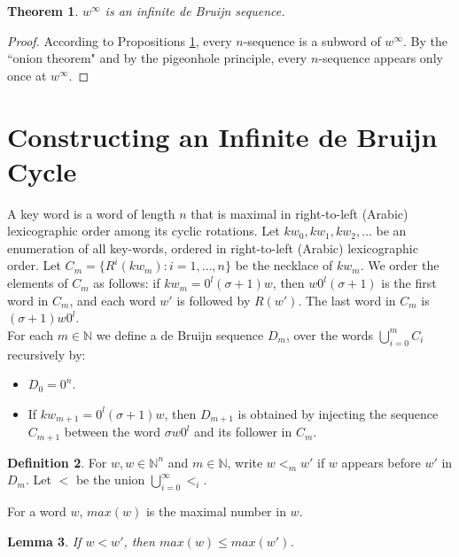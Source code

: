 \documentclass{article}
\newtheorem{theorem}{Theorem}
\newtheorem{lemma}[theorem]{Lemma}
\theoremstyle{definition}
\newtheorem{definition}[theorem]{Definition}
\newcommand{\N}{{\mathbb{N}}}
\begin{document}
\begin{theorem}
	$w^\infty$ is an infinite de Bruijn sequence.
\end{theorem}

\begin{proof}
	According to Propositions \ref{}, every $n$-sequence is a subword of $w^\infty$. By the ``onion theorem" and by the pigeonhole principle, every $n$-sequence appears only once at $w^\infty$.
\end{proof}


\section{Constructing an Infinite de Bruijn Cycle}

A key word is a word of length $n$ that is maximal in right-to-left (Arabic) lexicographic order among its cyclic rotations. Let $kw_0,kw_1,kw_2,\dots$ be an enumeration of all key-words, ordered in right-to-left (Arabic) lexicographic order. Let $C_m=\{R^i(kw_m): i=1,\dots,n\}$ be the necklace of $kw_m$. We order the elements of $C_m$ as follows:  if $kw_m=0^l(\sigma+1)w$, then $w0^l(\sigma+1)$ is the first word in $C_m$, and each word $w'$ is followed by $R(w')$. The last word in $C_m$ is $(\sigma+1)w0^l$.\\

For each $m \in \N$ we define a de Bruijn sequence $D_m$, over the words $\bigcup_{i=0}^m C_i$ recursively by:
\begin{itemize}
	\item $D_0=0^n$.
	\item If $kw_{m+1}=0^l(\sigma+1)w$, then $D_{m+1}$ is obtained by injecting the sequence $C_{m+1}$ between the word $\sigma w 0^l$ and its follower in $C_m$.
\end{itemize}


\begin{definition}
	For $w,w\in \N^n$ and $m\in \N$, write $w<_m w'$ if $w$ appears before $w'$ in $D_m$. Let $<$ be the union $\bigcup_{i=0}^\infty <_i$.
\end{definition}

For a word $w$, $max(w)$ is the maximal number in $w$.

\begin{lemma}
	If $w<w'$, then $max(w)\leq max(w')$.
\end{lemma}
\end{document}
